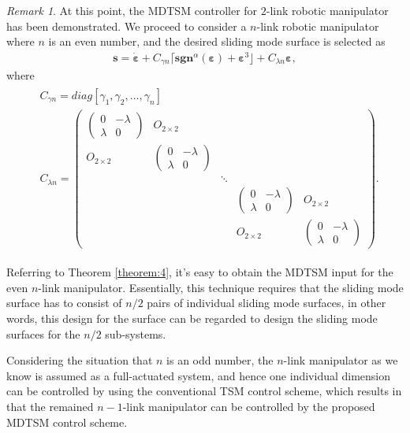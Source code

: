 \documentclass[3p]{elsarticle}
\theoremstyle{plain}
\theoremstyle{remark}
\newtheorem{myrem}{Remark}
\begin{document}
\begin{myrem}
At this point, the MDTSM controller for $2$-link robotic manipulator has been demonstrated. We proceed to consider a $n$-link robotic manipulator where $n$ is an even number, and the desired sliding mode  surface is selected as
\begin{align}
\bm s = \dot{\bm \varepsilon}+C_{\gamma n}\lceil\bm{sgn}^\alpha(\bm \varepsilon)+\bm\varepsilon^3\rfloor+C_{\lambda n}{\bm\varepsilon},
\end{align}
where
\begin{align}
\begin{split}
&C_{\gamma n}=diag[\gamma_1,\gamma_2,\ldots,\gamma_n]\\
&C_{\lambda n}=
\begin{pmatrix}
\begin{pmatrix}
0 &-\lambda\\ \lambda &0
\end{pmatrix} &O_{2\times 2} & & &\\
O_{2\times 2} &\begin{pmatrix}
0 &-\lambda\\ \lambda &0
\end{pmatrix} & & &\\
& &\ddots & &\\
& & &\begin{pmatrix}
0 &-\lambda\\ \lambda &0
\end{pmatrix} &O_{2\times 2}\\
& & &O_{2\times 2} &\begin{pmatrix}
0 &-\lambda\\ \lambda &0
\end{pmatrix}
\end{pmatrix}.
\end{split}
\end{align}\par
Referring to Theorem \ref{theorem:4}, it's easy to obtain the MDTSM input for the even $n$-link manipulator. Essentially, this technique requires that the sliding mode  surface has to consist of $n/2$ pairs of individual sliding mode  surfaces, in other words, this design for the surface can be regarded to design the sliding mode  surfaces for the $n/2$ sub-systems.\par
Considering the situation that $n$ is an odd number, the $n$-link manipulator as we know is assumed as a full-actuated system, and hence one individual dimension can be controlled by using the conventional TSM control scheme, which results in that the remained $n-1$-link manipulator can be controlled by the proposed MDTSM control scheme.
\end{myrem}
\end{document}
